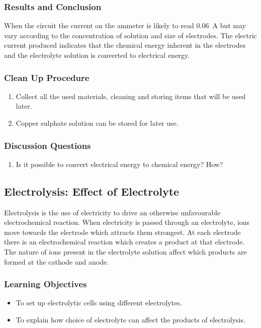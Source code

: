 \subsubsection*{Results and Conclusion}
When the circuit the current on the ammeter is likely to read 0.06~A but may vary according to the concentration of solution and size of electrodes. The electric current produced indicates that the chemical energy inherent in the electrodes and the electrolyte solution is converted to electrical energy.

\subsubsection*{Clean Up Procedure}
\begin{enumerate}
\item{Collect all the used materials, cleaning and storing items that will be used later.}
\item{Copper sulphate solution can be stored for later use.}
\end{enumerate}

\subsubsection*{Discussion Questions}
\begin{enumerate}
\item{Is it possible to convert electrical energy to chemical energy? How?}
\end{enumerate}


\subsection{Electrolysis: Effect of Electrolyte}

Electrolysis is the use of electricity to drive an otherwise unfavourable electrochemical reaction. When electricity is passed through an electrolyte, ions move towards the electrode which attracts them strongest. At each electrode there is an electrochemical reaction which creates a product at that electrode. The nature of ions present in the electrolyte solution affect which products are formed at the cathode and anode.

\subsubsection*{Learning Objectives}
\begin{itemize}
\item{To set up electrolytic cells using different electrolytes.}
\item{To explain how choice of electrolyte can affect the products of electrolysis.}
\end{itemize}

